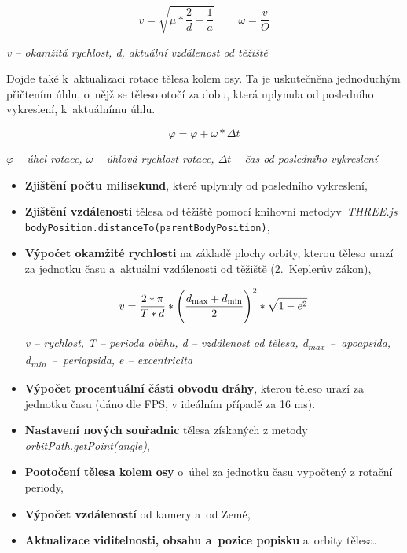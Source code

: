 \documentclass[a4paper,12pt]{article}
\def\code#1{\texttt{#1}}
\begin{document}
\vspace*{-0.5cm}
$$v = \sqrt{\mu * \frac{2}{d} - \frac{1}{a}}~~~~~~~~~~\omega = \frac{v}{O}$$
\begin{center}
\textit{v -- okamžitá rychlost, d, aktuální vzdálenost od těžiště}
\end{center}

Dojde také k~aktualizaci rotace tělesa kolem osy. Ta je uskutečněna jednoduchým přičtením úhlu, o~nějž se těleso otočí za dobu, která uplynula od posledního vykreslení, k~aktuálnímu úhlu.

\vspace*{-0.5cm}
$$\varphi = \varphi + \omega * \Delta t$$
\begin{center}
\textit{$\varphi$ -- úhel rotace, $\omega$ -- úhlová rychlost rotace, $\Delta t$ -- čas od posledního vykreslení}
\end{center}

\begin{itemize}
\item \textbf{Zjištění počtu milisekund}, které uplynuly od posledního vykreslení,



\item \textbf{Zjištění vzdálenosti} tělesa od těžiště pomocí knihovní metody\linebreak v~\textit{THREE.js} \code{bodyPosition.distanceTo(parentBodyPosition)},

\item \textbf{Výpočet okamžité rychlosti} na základě plochy orbity, kterou těleso urazí za jednotku času a~aktuální vzdálenosti od těžiště (2.~Keplerův zákon),

\begin{center}
$$v = \frac{2 * \pi}{T * d}  * \Bigg(\frac{d\textsubscript{max} + d\textsubscript{min}}{2}\Bigg) ^2 * \sqrt{1 - e^2}$$

\textit{v -- rychlost, T -- perioda oběhu, d -- vzdálenost od tělesa, d\textsubscript{max}~--~apoapsida, d\textsubscript{min}~--~periapsida, e -- excentricita}~\cite{kleczek}
\end{center}

\item \textbf{Výpočet procentuální části obvodu dráhy}, kterou těleso urazí za jednotku času (dáno dle FPS, v ideálním případě za 16 ms).

\item \textbf{Nastavení nových souřadnic} tělesa získaných z metody  \textit{orbitPath.getPoint(angle)},

\item \textbf{Pootočení tělesa kolem osy} o~úhel za jednotku času vypočtený z rotační periody,

\item \textbf{Výpočet vzdáleností} od kamery a~od Země,

\item \textbf{Aktualizace viditelnosti, obsahu a~pozice popisku} a~orbity tělesa.
\end{itemize}
\end{document}
